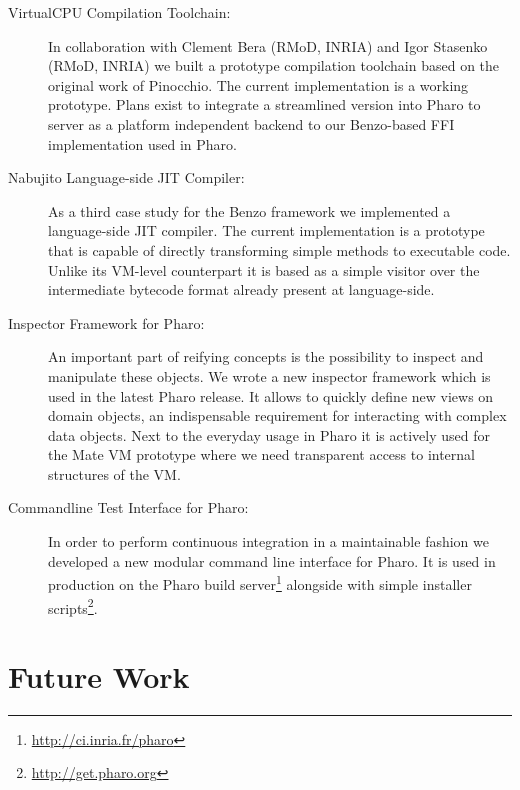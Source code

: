 \begin{description}
	\item[VirtualCPU Compilation Toolchain:]
In collaboration with Clement Bera (RMoD, INRIA) and Igor Stasenko (RMoD, INRIA) we built a prototype compilation toolchain based on the original work of Pinocchio.
The current implementation is a working prototype.
Plans exist to integrate a streamlined version into Pharo to server as a platform independent backend to our Benzo-based FFI implementation used in Pharo.

	\item[Nabujito Language-side JIT Compiler:]
As a third case study for the Benzo framework we implemented a language-side JIT compiler. 
The current implementation is a prototype that is capable of directly transforming simple methods to executable code.
Unlike its VM-level counterpart it is based as a simple visitor over the intermediate bytecode format already present at language-side.

	\item[Inspector Framework for Pharo:] 
An important part of reifying concepts is the possibility to inspect and manipulate these objects.
We wrote a new inspector framework which is used in the latest Pharo release.
It allows to quickly define new views on domain objects, an indispensable requirement for interacting with complex data objects.
Next to the everyday usage in Pharo it is actively used for the Mate VM prototype where we need transparent access to internal structures of the VM.

	\item[Commandline Test Interface for Pharo:]
In order to perform continuous integration in a maintainable fashion we developed a new modular command line interface for Pharo. 
It is used in production on the Pharo build server\footnote{\url{http://ci.inria.fr/pharo}} alongside with simple installer scripts\footnote{\url{http://get.pharo.org}}.
\end{description}


\section{Future Work}


